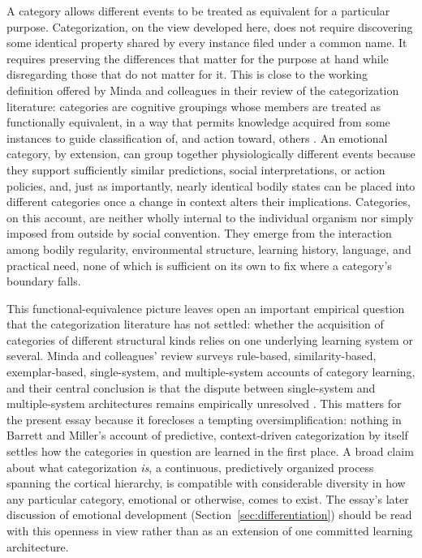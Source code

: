 \documentclass[11pt]{article}
\begin{document}
A category allows different events to be treated as equivalent for a particular purpose. Categorization, on the view developed here, does not require discovering some identical property shared by every instance filed under a common name. It requires preserving the differences that matter for the purpose at hand while disregarding those that do not matter for it. This is close to the working definition offered by Minda and colleagues in their review of the categorization literature: categories are cognitive groupings whose members are treated as functionally equivalent, in a way that permits knowledge acquired from some instances to guide classification of, and action toward, others \citep{Minda2024}. An emotional category, by extension, can group together physiologically different events because they support sufficiently similar predictions, social interpretations, or action policies, and, just as importantly, nearly identical bodily states can be placed into different categories once a change in context alters their implications. Categories, on this account, are neither wholly internal to the individual organism nor simply imposed from outside by social convention. They emerge from the interaction among bodily regularity, environmental structure, learning history, language, and practical need, none of which is sufficient on its own to fix where a category's boundary falls.

This functional-equivalence picture leaves open an important empirical question that the categorization literature has not settled: whether the acquisition of categories of different structural kinds relies on one underlying learning system or several. Minda and colleagues' review surveys rule-based, similarity-based, exemplar-based, single-system, and multiple-system accounts of category learning, and their central conclusion is that the dispute between single-system and multiple-system architectures remains empirically unresolved \citep{Minda2024}. This matters for the present essay because it forecloses a tempting oversimplification: nothing in Barrett and Miller's account of predictive, context-driven categorization by itself settles how the categories in question are learned in the first place. A broad claim about what categorization \emph{is}, a continuous, predictively organized process spanning the cortical hierarchy, is compatible with considerable diversity in how any particular category, emotional or otherwise, comes to exist. The essay's later discussion of emotional development (Section~\ref{sec:differentiation}) should be read with this openness in view rather than as an extension of one committed learning architecture.
\end{document}
